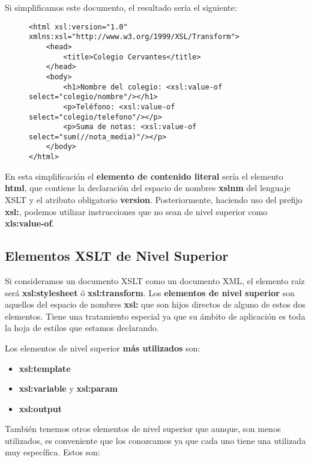 Si simplificamos este documento, el resultado sería el siguiente:

\begin{figure}[H]
    \begin{tcolorbox}[sharp corners, colback=yellow!30, colframe=white!20]
        \scriptsize
\begin{verbatim}
<html xsl:version="1.0" xmlns:xsl="http://www.w3.org/1999/XSL/Transform">
    <head>
        <title>Colegio Cervantes</title>
    </head>
    <body>
        <h1>Nombre del colegio: <xsl:value-of select="colegio/nombre"/></h1>
        <p>Teléfono: <xsl:value-of select="colegio/telefono"/></p>
        <p>Suma de notas: <xsl:value-of select="sum(//nota_media)"/></p>
    </body>
</html>
\end{verbatim}
    \end{tcolorbox}
\end{figure}

En esta simplificación el \textbf{elemento de contenido literal} sería el elemento \textbf{html}, que contiene la declaración  del espacio de nombres \textbf{xslnm} del lenguaje XSLT y el atributo obligatorio \textbf{version}. Posteriormente, haciendo uso del prefijo \textbf{xsl:}, podemos utilizar instrucciones que no sean de nivel superior como \textbf{xls:value-of}.

\subsection{Elementos XSLT de Nivel Superior}
Si consideramos un documento XSLT como un documento XML, el elemento raíz será \textbf{xsl:stylesheet} ó \textbf{xsl:transform}. Los \textbf{elementos de nivel superior} son aquellos del espacio de nombres \textbf{xsl:} que son hijos directos de alguno de estos dos elementos. Tiene una tratamiento especial ya que su ámbito de aplicación es toda la hoja de estilos que estamos declarando.

Los elementos de nivel superior \textbf{más utilizados} son:

\begin{itemize}
    \item \textbf{xsl:template}
    \item \textbf{xsl:variable} y \textbf{xsl:param}
    \item \textbf{xsl:output}
\end{itemize}

También tenemos otros elementos de nivel superior que aunque, son menos utilizados, es conveniente que los conozcamos ya que cada uno tiene una utilizada muy específica. Estos son:

